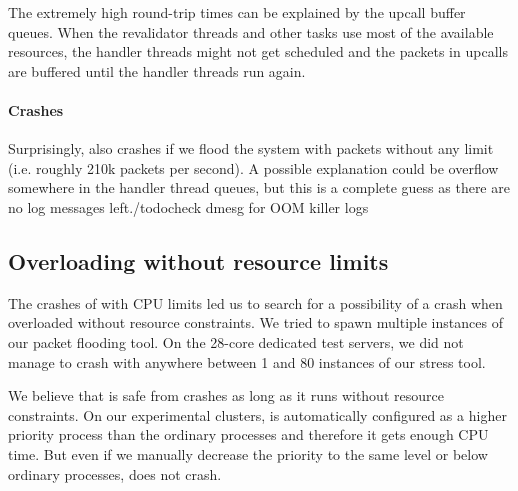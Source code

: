 The extremely high round-trip times can be explained by the upcall buffer queues. When the revalidator threads and other tasks use most of the available resources, the handler threads might not get scheduled and the packets in upcalls are buffered until the handler threads run again.

\paragraph{Crashes}
\label{par:cpu-crashes}
Surprisingly,  also crashes if we flood the system with packets without any limit (i.e. roughly 210k packets per second). A possible explanation could be overflow somewhere in the handler thread queues, but this is a complete guess as there are no log messages left./todo{check dmesg for OOM killer logs}

\subsection{Overloading  without resource limits}

The crashes of  with CPU limits led us to search for a possibility of a crash when overloaded without resource constraints. We tried to spawn multiple instances of our packet flooding tool. On the 28-core dedicated test servers, we did not manage to crash  with anywhere between 1 and 80 instances of our stress tool.

We believe that  is safe from crashes as long as it runs without resource constraints. On our experimental clusters,  is automatically configured as a higher priority process than the ordinary processes and therefore it gets enough CPU time. But even if we manually decrease the priority to the same level or below ordinary processes,  does not crash.